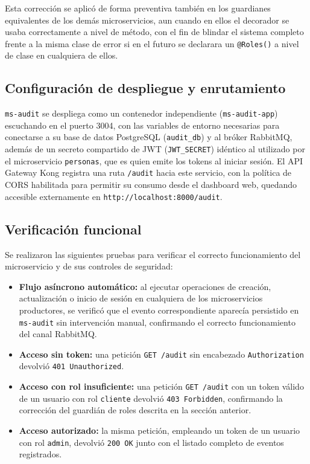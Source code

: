 \documentclass[12pt,letterpaper]{article}
\begin{document}
Esta corrección se aplicó de forma preventiva también en los guardianes equivalentes de los demás microservicios, aun cuando en ellos el decorador se usaba correctamente a nivel de método, con el fin de blindar el sistema completo frente a la misma clase de error si en el futuro se declarara un \texttt{@Roles()} a nivel de clase en cualquiera de ellos.

\subsection{Configuración de despliegue y enrutamiento}

\texttt{ms-audit} se despliega como un contenedor independiente (\texttt{ms-audit-app}) escuchando en el puerto 3004, con las variables de entorno necesarias para conectarse a su base de datos PostgreSQL (\texttt{audit\_db}) y al bróker RabbitMQ, además de un secreto compartido de JWT (\texttt{JWT\_SECRET}) idéntico al utilizado por el microservicio \texttt{personas}, que es quien emite los tokens al iniciar sesión. El API Gateway Kong registra una ruta \texttt{/audit} hacia este servicio, con la política de CORS habilitada para permitir su consumo desde el dashboard web, quedando accesible externamente en \texttt{http://localhost:8000/audit}.

\subsection{Verificación funcional}

Se realizaron las siguientes pruebas para verificar el correcto funcionamiento del microservicio y de sus controles de seguridad:

\begin{itemize}
  \item \textbf{Flujo asíncrono automático:} al ejecutar operaciones de creación, actualización o inicio de sesión en cualquiera de los microservicios productores, se verificó que el evento correspondiente aparecía persistido en \texttt{ms-audit} sin intervención manual, confirmando el correcto funcionamiento del canal RabbitMQ.
  \item \textbf{Acceso sin token:} una petición \texttt{GET /audit} sin encabezado \texttt{Authorization} devolvió \texttt{401 Unauthorized}.
  \item \textbf{Acceso con rol insuficiente:} una petición \texttt{GET /audit} con un token válido de un usuario con rol \texttt{cliente} devolvió \texttt{403 Forbidden}, confirmando la corrección del guardián de roles descrita en la sección anterior.
  \item \textbf{Acceso autorizado:} la misma petición, empleando un token de un usuario con rol \texttt{admin}, devolvió \texttt{200 OK} junto con el listado completo de eventos registrados.
\end{itemize}
\end{document}

